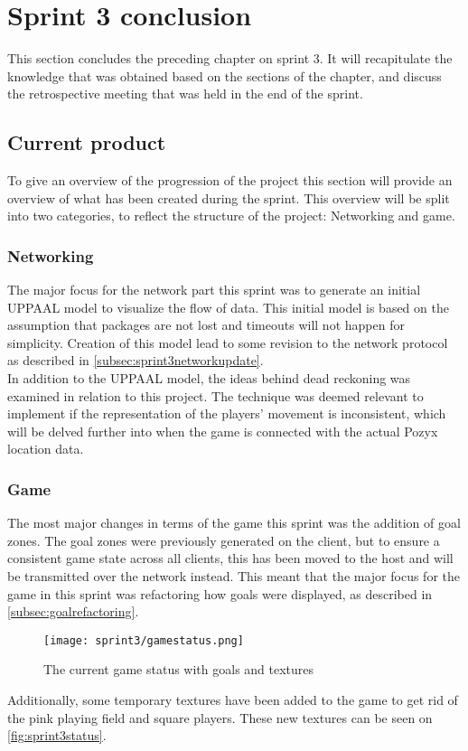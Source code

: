 \section{Sprint 3 conclusion}\label{sec:sprint3conclusion}
This section concludes the preceding chapter on sprint 3.
It will recapitulate the knowledge that was obtained based on the sections of the chapter, and discuss the retrospective meeting that was held in the end of the sprint.

\subsection{Current product}
To give an overview of the progression of the project this section will provide an overview of what has been created during the sprint.
This overview will be split into two categories, to reflect the structure of the project: Networking and game.

\subsubsection{Networking}
The major focus for the network part this sprint was to generate an initial UPPAAL model to visualize the flow of data.
This initial model is based on the assumption that packages are not lost and timeouts will not happen for simplicity.
Creation of this model lead to some revision to the network protocol as described in \autoref{subsec:sprint3networkupdate}.\\
In addition to the UPPAAL model, the ideas behind dead reckoning was examined in relation to this project.
The technique was deemed relevant to implement if the representation of the players' movement is inconsistent, which will be delved further into when the game is connected with the actual Pozyx location data.

\subsubsection{Game}
The most major changes in terms of the game this sprint was the addition of goal zones.
The goal zones were previously generated on the client, but to ensure a consistent game state across all clients, this has been moved to the host and will be transmitted over the network instead.
This meant that the major focus for the game in this sprint was refactoring how goals were displayed, as described in \autoref{subsec:goalrefactoring}.

\begin{figure}[H]
	\centering
	\texttt{[image: sprint3/gamestatus.png]}
	\caption{The current game status with goals and textures}
	\label{fig:sprint3status}
\end{figure}
\noindent
Additionally, some temporary textures have been added to the game to get rid of the pink playing field and square players.
These new textures can be seen on \autoref{fig:sprint3status}.

